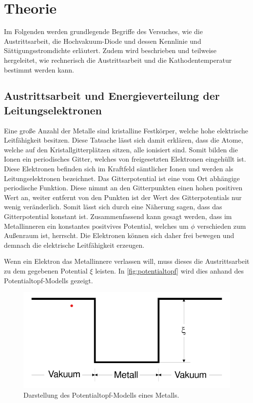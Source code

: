 \section{Theorie}
\label{sec:theorie}

Im Folgenden werden grundlegende Begriffe des Versuches, wie die Austrittsarbeit, die Hochvakuum-Diode und dessen Kennlinie und Sättigungsstromdichte erläutert.
Zudem wird beschrieben und teilweise hergeleitet, wie rechnerisch die Austrittsarbeit und die Kathodentemperatur bestimmt werden kann.

\subsection{Austrittsarbeit und Energieverteilung der Leitungselektronen}
\label{sec:Begriffe der Austrittsarbeit und die Energieverteilung der Leitungselektronen}

Eine große Anzahl der Metalle sind kristalline Festkörper, welche hohe elektrische Leitfähigkeit besitzen.
Diese Tatsache lässt sich damit erklären, dass die Atome, welche auf den Kristallgitterplätzen sitzen, alle ionisiert sind.
Somit bilden die Ionen ein periodisches Gitter, welches von freigesetzten Elektronen eingehüllt ist.
Diese Elektronen befinden sich im Kraftfeld sämtlicher Ionen und werden als Leitungselektronen bezeichnet.
Das Gitterpotential ist eine vom Ort abhängige periodische Funktion. Diese nimmt an den Gitterpunkten einen hohen positiven Wert an,
weiter entfernt von den Punkten ist der Wert des Gitterpotentials nur wenig veränderlich. Somit lässt sich durch eine
Näherung sagen, dass das Gitterpotential konstant ist. Zusammenfassend kann gesagt werden, dass im Metallinneren ein konstantes 
positvives Potential, welches um $\phi$ verschieden zum Außenraum ist, herrscht. Die Elektronen können sich daher 
frei bewegen und demnach die elektrische Leitfähigkeit erzeugen.

Wenn ein Elektron das Metallinnere verlassen will, muss dieses die Austrittsarbeit zu dem gegebenen Potential $\xi$ leisten.
In \autoref{fig:potentialtopf} wird dies anhand des Potentialtopf-Modells gezeigt.
\begin{figure}[H]
    \centering
    \includegraphics[width=0.5\linewidth]{content/grafik/potential.png}
    \caption{Darstellung des Potentialtopf-Modells eines Metalls.\cite{elektron}}
    \label{fig:potentialtopf}
\end{figure}

